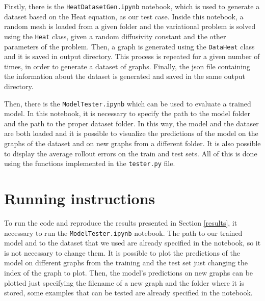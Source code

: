 \documentclass[11pt,a4paper]{article}
\begin{document}
Firstly, there is the \texttt{HeatDatasetGen.ipynb} notebook, which is used to generate a dataset based on the Heat equation, as our test case. Inside this notebook, a random mesh is loaded from a given folder and the variational problem is solved using the \texttt{Heat} class, given a random diffusivity constant and the other parameters of the problem. Then, a graph is generated using the \texttt{DataHeat} class and it is saved in output directory. This process is repeated for a given number of times, in order to generate a dataset of graphs. Finally, the json file containing the information about the dataset is generated and saved in the same output directory. 


Then, there is the \texttt{ModelTester.ipynb} which can be used to evaluate a trained model. In this notebook, it is necessary to specify the path to the model folder and the path to the proper dataset folder. In this way, the model and the dataser are both loaded and it is possible to visualize the predictions of the model on the graphs of the dataset and on new graphs from a different folder. It is also possible to display the average rollout errors on the train and test sets. All of this is done using the functions implemented in the \texttt{tester.py} file.

\section{Running instructions}

To run the code and reproduce the results presented in Section \ref{results}, it necessary to run the \texttt{ModelTester.ipynb} notebook. The path to our trained model and to the dataset that we used are already specified in the notebook, so it is not necessary to change them. It is possible to plot the predictions of the model on different graphs from the training and the test set just changing the index of the graph to plot. Then, the model's predictions on new graphs can be plotted just specifying the filename of a new graph and the folder where it is stored, some examples that can be tested are already specified in the notebook. 
\end{document}
